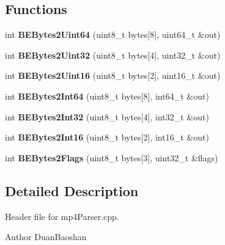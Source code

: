\subsection*{Functions}
\begin{DoxyCompactItemize}
\item 
\mbox{\label{namespacemp4_parser_ac8d7c4dee7c9982c478ed0b78e85f0db}} 
int {\bfseries B\+E\+Bytes2\+Uint64} (uint8\+\_\+t bytes\mbox{[}8\mbox{]}, uint64\+\_\+t \&out)
\item 
\mbox{\label{namespacemp4_parser_ac29099d53a16804ed5729fb3a28f3a56}} 
int {\bfseries B\+E\+Bytes2\+Uint32} (uint8\+\_\+t bytes\mbox{[}4\mbox{]}, uint32\+\_\+t \&out)
\item 
\mbox{\label{namespacemp4_parser_a5b838e5598ef474059260f1363e189a3}} 
int {\bfseries B\+E\+Bytes2\+Uint16} (uint8\+\_\+t bytes\mbox{[}2\mbox{]}, uint16\+\_\+t \&out)
\item 
\mbox{\label{namespacemp4_parser_acbf05e1c05e7e8eae17faed59a800be0}} 
int {\bfseries B\+E\+Bytes2\+Int64} (uint8\+\_\+t bytes\mbox{[}8\mbox{]}, int64\+\_\+t \&out)
\item 
\mbox{\label{namespacemp4_parser_a64385020b2982bc7dfe82d023a5965a3}} 
int {\bfseries B\+E\+Bytes2\+Int32} (uint8\+\_\+t bytes\mbox{[}4\mbox{]}, int32\+\_\+t \&out)
\item 
\mbox{\label{namespacemp4_parser_a7d63f4198428280fad600765f0ffc19e}} 
int {\bfseries B\+E\+Bytes2\+Int16} (uint8\+\_\+t bytes\mbox{[}2\mbox{]}, int16\+\_\+t \&out)
\item 
\mbox{\label{namespacemp4_parser_a51b183d12504b22d4381f01cd5efc605}} 
int {\bfseries B\+E\+Bytes2\+Flags} (uint8\+\_\+t bytes\mbox{[}3\mbox{]}, uint32\+\_\+t \&flags)
\end{DoxyCompactItemize}


\subsection{Detailed Description}
Header file for mp4\+Parser.\+cpp. 

\begin{DoxyAuthor}{Author}
Duan\+Baoshan 
\end{DoxyAuthor}
